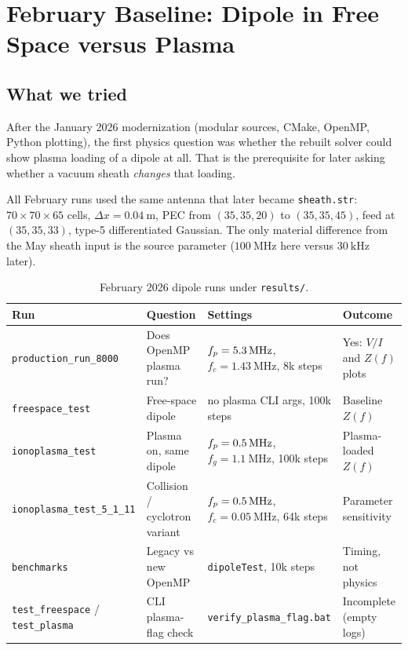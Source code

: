 \chapter{February Baseline: Dipole in Free Space versus Plasma}
\label{ch:february}

\section{What we tried}

After the January 2026 modernization (modular sources, CMake, OpenMP, Python plotting), the first physics question was whether the rebuilt solver could show plasma loading of a dipole at all. That is the prerequisite for later asking whether a vacuum sheath \emph{changes} that loading.

All February runs used the same antenna that later became \texttt{sheath.str}: \(70\times 70\times 65\) cells, \(\Delta x=\SI{0.04}{\meter}\), PEC from \((35,35,20)\) to \((35,35,45)\), feed at \((35,35,33)\), type-5 differentiated Gaussian. The only material difference from the May sheath input is the source parameter (\(\SI{100}{\mega\hertz}\) here versus \(\SI{30}{\kilo\hertz}\) later).

\begin{table}[ht]
\centering
\caption{February 2026 dipole runs under \texttt{results/}.}
\label{tab:feb-runs}
\begin{tabular}{@{}llll@{}}
\toprule
Run & Question & Settings & Outcome \\
\midrule
\texttt{production\_run\_8000} & Does OpenMP plasma run? & \(f_p=\SI{5.3}{\mega\hertz}\), \(f_c=\SI{1.43}{\mega\hertz}\), 8k steps & Yes: \(V/I\) and \(Z(f)\) plots \\
\texttt{freespace\_test} & Free-space dipole & no plasma CLI args, 100k steps & Baseline \(Z(f)\) \\
\texttt{ionoplasma\_test} & Plasma on, same dipole & \(f_p=\SI{0.5}{\mega\hertz}\), \(f_g=\SI{1.1}{\mega\hertz}\), 100k steps & Plasma-loaded \(Z(f)\) \\
\texttt{ionoplasma\_test\_5\_1\_11} & Collision / cyclotron variant & \(f_p=\SI{0.5}{\mega\hertz}\), \(f_c=\SI{0.05}{\mega\hertz}\), 64k steps & Parameter sensitivity \\
\texttt{benchmarks} & Legacy vs new OpenMP & \texttt{dipoleTest}, 10k steps & Timing, not physics \\
\texttt{test\_freespace} / \texttt{test\_plasma} & CLI plasma-flag check & \texttt{verify\_plasma\_flag.bat} & Incomplete (empty logs) \\
\bottomrule
\end{tabular}
\end{table}

